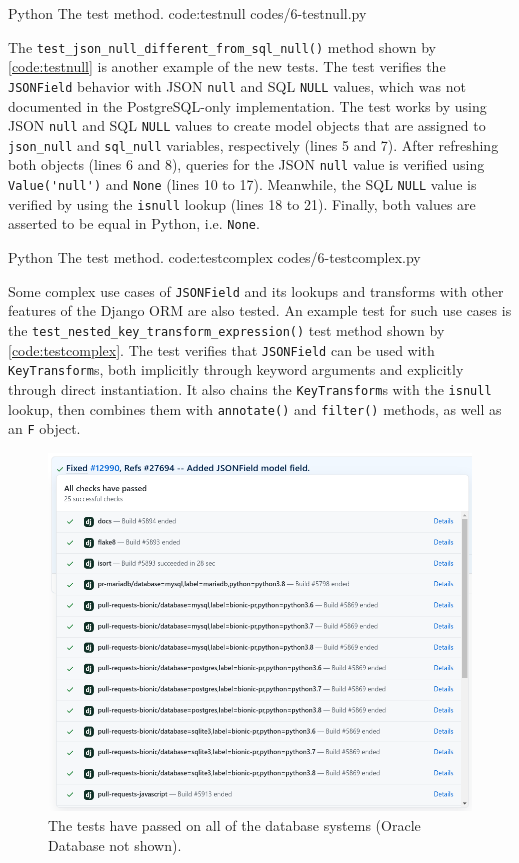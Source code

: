 \listing
{Python}
{The  test method.}
{code:testnull}
{codes/6-testnull.py}

The \verb|test_json_null_different_from_sql_null()| method shown by
\autoref{code:testnull} is another example of the new tests. The test verifies
the \verb|JSONField| behavior with JSON \verb|null| and SQL \verb|NULL| values,
which was not documented in the PostgreSQL-only implementation. The test works
by using JSON \verb|null| and SQL \verb|NULL| values to create model objects
that are assigned to \verb|json_null| and \verb|sql_null| variables,
respectively (lines 5 and 7). After refreshing both objects (lines 6 and 8),
queries for the JSON \verb|null| value is verified using \verb|Value('null')|
and \verb|None| (lines 10 to 17). Meanwhile, the SQL \verb|NULL| value is
verified by using the \verb|isnull| lookup (lines 18 to 21). Finally, both
values are asserted to be equal in Python, i.e. \verb|None|.

\listing
{Python}
{The  test method.}
{code:testcomplex}
{codes/6-testcomplex.py}

Some complex use cases of \verb|JSONField| and its lookups and transforms with
other features of the Django ORM are also tested. An example test for such use
cases is the \verb|test_nested_key_transform_expression()| test method shown by
\autoref{code:testcomplex}. The test verifies that \verb|JSONField| can be used
with \verb|KeyTransform|s, both implicitly through keyword arguments and
explicitly through direct instantiation. It also chains the
\verb|KeyTransform|s with the \verb|isnull| lookup, then combines them with
\verb|annotate()| and \verb|filter()| methods, as well as an \verb|F| object.

\begin{figure}
	\centering
    \includegraphics[width=1.00\textwidth]{pics/github-checks.png}
	\caption{The tests have passed on all of the database systems
	(Oracle Database not shown).}
	\label{fig:checks}
\end{figure}


